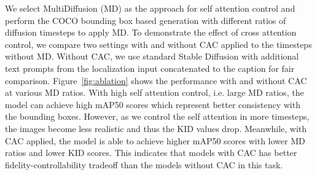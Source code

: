 We select MultiDiffusion (MD) as the approach for self attention control and perform the COCO bounding box based generation with different ratios of diffusion timesteps to apply MD. To demonstrate the effect of cross attention control, we compare two settings with and without CAC applied to the timesteps without MD. Without CAC, we use standard Stable Diffusion with additional text prompts from the localization input concatenated to the caption for fair comparison. Figure~\ref{fig:ablation} shows the performance with and without CAC at various MD ratios. With high self attention control, i.e. large MD ratios, the model can achieve high mAP50 scores which represent better consistency with the bounding boxes. However, as we control the self attention in more timesteps, the images become less realistic and thus the KID values drop. Meanwhile, with CAC applied, the model is able to achieve higher mAP50 scores with lower MD ratios and lower KID scores. This indicates that models with CAC has better fidelity-controllability tradeoff than the models without CAC in this task.

